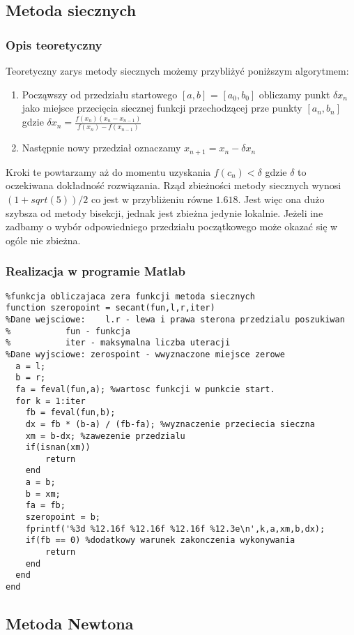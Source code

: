 \documentclass[a4paper, 11pt]{article}
\begin{document}
\subsection{Metoda siecznych}
\subsubsection{Opis teoretyczny}
Teoretyczny zarys metody siecznych możemy przybliżyć poniższym algorytmem:
\begin{enumerate}
  \item Począwszy od przedziału startowego $[a,b]$ = $[a_{0},b_{0}]$ obliczamy punkt $\delta x_{n}$ jako miejsce przecięcia siecznej funkcji przechodzącej prze punkty $[a_{n},b_{n}]$ gdzie $\delta x_{n}=\frac{f(x_{n})(x_{n}-x_{n-1})}{f(x_{n})-f(x_{n-1})}$
  \item Następnie nowy przedział oznaczamy $x_{n+1}=x_{n}-\delta x_{n}$ 
\end{enumerate} 
Kroki te powtarzamy aż do momentu uzyskania $f(c_{n})<\delta$ gdzie $\delta$ to oczekiwana dokładność rozwiązania. Rząd zbieżności metody siecznych wynosi $(1+sqrt(5))/2$ co jest w przybliżeniu równe $1.618$. 
Jest więc ona dużo szybsza od metody bisekcji, jednak jest zbieżna jedynie lokalnie. Jeżeli ine zadbamy o wybór odpowiedniego przedziału początkowego może okazać się w ogóle nie zbieżna.


\subsubsection{Realizacja w programie Matlab}
\begin{lstlisting}
%funkcja obliczajaca zera funkcji metoda siecznych
function szeropoint = secant(fun,l,r,iter)
%Dane wejsciowe:	l.r - lewa i prawa sterona przedzialu poszukiwan
%			fun - funkcja 
%			iter - maksymalna liczba uteracji
%Dane wyjsciowe: zerospoint - wwyznaczone miejsce zerowe
  a = l;
  b = r;
  fa = feval(fun,a); %wartosc funkcji w punkcie start.
  for k = 1:iter
    fb = feval(fun,b);
    dx = fb * (b-a) / (fb-fa); %wyznaczenie przeciecia sieczna
    xm = b-dx; %zawezenie przedzialu
    if(isnan(xm))
        return
    end
    a = b;
    b = xm;
    fa = fb;
    szeropoint = b;
    fprintf('%3d %12.16f %12.16f %12.16f %12.3e\n',k,a,xm,b,dx);
    if(fb == 0) %dodatkowy warunek zakonczenia wykonywania
        return
    end
  end
end
\end{lstlisting}

\subsection{Metoda Newtona}
\end{document}
